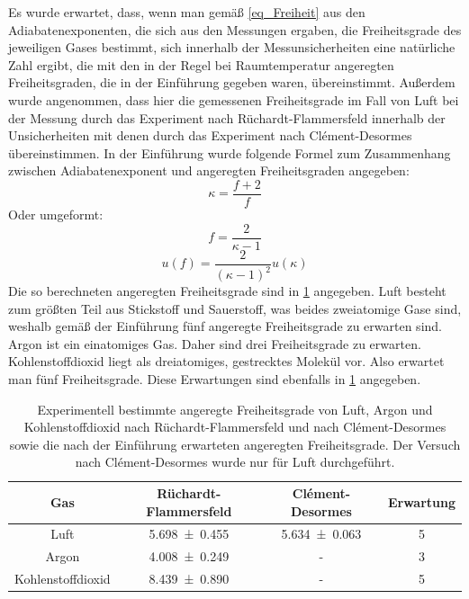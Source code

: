 \documentclass[
	a4paper,
	12pt,
	pagesize,
	ngerman
]{scrartcl}
\begin{document}
	Es wurde erwartet, dass, wenn man gemäß \cref{eq_Freiheit} aus den Adiabatenexponenten, die sich aus den Messungen ergaben, die Freiheitsgrade des jeweiligen Gases bestimmt, sich innerhalb der Messunsicherheiten eine natürliche Zahl ergibt, die mit den in der Regel bei Raumtemperatur angeregten Freiheitsgraden, die in der Einführung gegeben waren, übereinstimmt. %
	Außerdem wurde angenommen, dass hier die gemessenen Freiheitsgrade im Fall von Luft bei der Messung durch das Experiment nach Rüchardt-Flammersfeld innerhalb der Unsicherheiten mit denen durch das Experiment nach Clément-Desormes übereinstimmen.
	In der Einführung wurde folgende Formel zum Zusammenhang zwischen Adiabatenexponent und angeregten Freiheitsgraden angegeben:
	\begin{equation}
		\kappa = \frac{f+2}{f}
	\end{equation}
	Oder umgeformt:
	\begin{equation}
		f = \frac{2}{\kappa -1}
		\label{eq_Freiheit}
	\end{equation}
	\begin{equation}
	u(f) = \frac{2}{(\kappa -1)^2} u(\kappa) 
	\end{equation}
	Die so berechneten angeregten Freiheitsgrade sind in \cref{tab_Freiheit} angegeben.
	Luft besteht zum größten Teil aus Stickstoff und Sauerstoff, was beides zweiatomige Gase sind, weshalb gemäß der Einführung fünf angeregte Freiheitsgrade zu erwarten sind.
	Argon ist ein einatomiges Gas. %
	Daher sind drei Freiheitsgrade zu erwarten.
	Kohlenstoffdioxid liegt als dreiatomiges, gestrecktes Molekül vor.
	Also erwartet man fünf Freiheitsgrade.
	Diese Erwartungen sind ebenfalls in \cref{tab_Freiheit} angegeben.
	\begin{table}[H]
		\centering
		\begin{tabular}{ c | c | c | c }
			Gas & Rüchardt-Flammersfeld  & Clément-Desormes & Erwartung \\ \hline
			Luft & \SI{5,698 \pm 0,455}{} & \SI{5,634 \pm 0,063}{} & 5\\
			Argon & \SI{4,008 \pm 0,249}{} & - & 3\\
			Kohlenstoffdioxid & \SI{8,439 \pm 0,890}{} & - & 5\\
		\end{tabular}
		\caption{Experimentell bestimmte angeregte Freiheitsgrade von Luft, Argon und Kohlenstoffdioxid nach Rüchardt-Flammersfeld und nach Clément-Desormes sowie die nach der Einführung erwarteten angeregten Freiheitsgrade. Der Versuch nach Clément-Desormes wurde nur für Luft durchgeführt.}
		\label{tab_Freiheit}
	\end{table}
\end{document}
